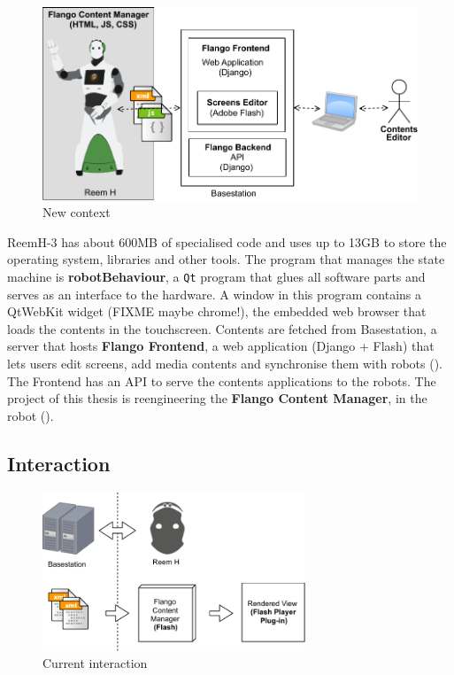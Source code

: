 \begin{figure}[htb]
    \label{fig:context-new}
    \centering
    \includegraphics[width=\textwidth]{figures/context-new}
    \caption{New context}
\end{figure}

ReemH-3 has about 600MB of specialised code and uses up to 13GB to store the operating system, libraries and other tools.
The program that manages the state machine is \textbf{robotBehaviour}, a \texttt{Qt} program that glues all software parts and serves as an interface to the hardware.
A window in this program contains a QtWebKit widget (FIXME maybe chrome!), the embedded web browser that loads the contents in the touchscreen.
Contents are fetched from Basestation, a server that hosts \textbf{Flango Frontend}, a web application (Django + Flash) that lets users edit screens, add media contents and synchronise them with robots ().
The Frontend has an \ac{API} to serve the contents applications to the robots.
The project of this thesis is reengineering the \textbf{Flango Content Manager}, in the robot ().

\subsection{Interaction}
\begin{figure}[htb]
    \label{fig:interaction-original}
    \centering
    \includegraphics[width=0.7\textwidth]{figures/interaction-original}
    \caption{Current interaction}
\end{figure}

